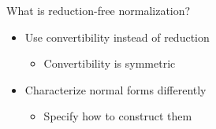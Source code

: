 \documentclass{beamer}
\begin{document}
\begin{frame}{What is reduction-free normalization?}
\begin{itemize}
    \item Use convertibility instead of reduction
    \begin{itemize}
        \item Convertibility is symmetric
    \end{itemize}
    \item Characterize normal forms differently
    \begin{itemize}
        \item Specify how to construct them
    \end{itemize}
\end{itemize}
\end{frame}


\begin{comment}
\begin{frame}{Normal forms and neutral terms}
\begin{itemize}
    \item We characterize \textit{long} $\beta\eta$-normal forms
    \item Normal form: no $\beta$-redex, functions are maximally applied, e.g.
    \begin{itemize}
        \item Examples: $\lamv{x}{\beta}{x}, \quad \lamv{z}{\beta}{\app{\app{x}{y}}{z}}$
        \item Non-examples: $\app{x}{y}, \text{ where } x \in \Var[\functy{\beta}{\functy{\beta}{\beta}}]$
    \end{itemize}
    \item Neutral term: a variable applied to 0 or more normal forms
    \begin{itemize}
        \item Examples: $x, \quad \app{x}{(\lamv{y}{\beta}{y})}$
    \end{itemize}
\end{itemize}
\end{frame}
\end{comment}
\end{document}
